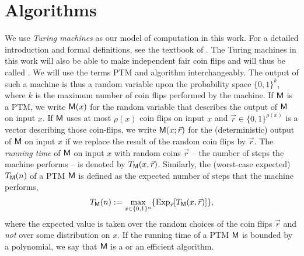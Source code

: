 \section{Algorithms}
We use \emph{Turing machines} as our model of computation in this
work. For a detailed introduction and formal definitions, see
the textbook of \citeauthor{papadimitriou1994complexity}
\cite{papadimitriou1994complexity}. The Turing machines in this work
will also be able to make independent fair coin flips and will thus be
called . We will use the
terms \ac{PTM} and algorithm interchangeably.  The output of such a
machine is thus a random variable upon the probability space
$\{0,1\}^{k}$, where $k$ is the maximum number of coin flips performed
by the machine. If $\mathsf{M}$ is a \ac{PTM}, we write $\mathsf{M}(x)$ for
the random variable that describes the output of $\mathsf{M}$ on input
$x$. If $\mathsf{M}$ uses at most $\rho(x)$ coin flips on input $x$ and
$\vec{r}\in \{0,1\}^{\rho(x)}$ is a vector describing those coin-flips,
we write $\mathsf{M}(x; \vec{r})$ for the (deterministic) output of $\mathsf{M}$
on input $x$ if we replace the result of the random coin flips by
$\vec{r}$. The \emph{running time} of $\mathsf{M}$ on input $x$ with random
coins $\vec{r}$ -- the number of steps the machine performs -- is denoted by
$T_{\mathsf{M}}(x,\vec{r})$. Similarly, the (worst-case expected)  $T_{\mathsf{M}}(n)$ of a \ac{PTM} $\mathsf{M}$ is defined
as the expected number of steps that the machine performs, \ie
\begin{align*}
  T_{\mathsf{M}}(n) := \max_{x\in \{0,1\}^{n}}\{\operatorname{Exp}_{\vec{r}}[T_{\mathsf{M}}(x,\vec{r})]\},
\end{align*}
where the expected value is taken over the random choices of the coin
flips $\vec{r}$ and \emph{not} over some distribution on $x$. If the running time of
a \ac{PTM} $\mathsf{M}$ is bounded by a polynomial, we say that $\mathsf{M}$
is a  or an efficient algorithm. 

